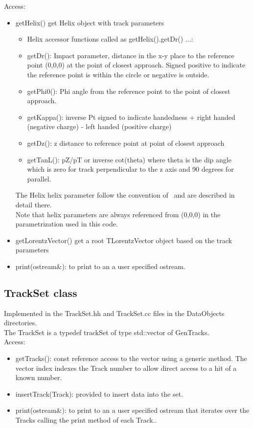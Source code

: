 \documentclass[aps,prd,superscriptaddress,floatfix]{revtex4}
\begin{document}
Access:
\begin{itemize}
\item getHelix() get Helix object with track parameters
\begin{itemize}
\item Helix accessor functions called as getHelix().getDr() ...:
\item getDr(): Impact parameter, distance in the x-y place to the reference point (0,0,0) at the point of closest
approach. Signed positive to indicate the reference point is within the circle or negative is outside.
\item getPhi0(): Phi angle from the reference point to the point of closest approach.
\item getKappa(): inverse Pt signed to indicate handedness + right handed (negative charge) - left handed
(positive charge)
\item getDz(): z distance to reference point at point of closest approach
\item getTanL(): pZ/pT or inverse cot(theta) where theta is the dip angle which is zero for track perpendicular
to the z axis and 90 degrees for parallel.
\end{itemize}
The Helix helix parameter follow the convention of~\cite{helix} and are described in detail there.\\
Note that helix parameters are always referenced from (0,0,0) in the parametrization used in this code.
\item getLorentzVector() get a root TLorentzVector object based on the track parameters
\item print(ostream\&): to print to an a user specified ostream.

\end{itemize}


\subsection{TrackSet class}
Implemented in the TrackSet.hh and TrackSet.cc files in the DataObjects directories.
\\

The TrackSet is a typedef trackSet of type std::vector of GenTracks.
\\

Access:
\begin{itemize}
\item getTracks(): const reference access to the vector using a generic method.
The vector index indexes the Track number to allow direct access to a hit of a known number.

\item insertTrack(Track): provided to insert data into the set.


\item print(ostream\&): to print to an a user specified ostream that iterates over
the Tracks calling the print method of each Track..
\end{itemize}
\end{document}
